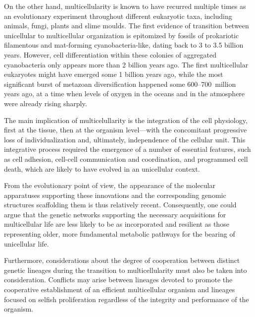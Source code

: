 \documentclass{tufte-book}
\begin{document}

On the other hand, multicellularity is known to have recurred multiple times as
an evolutionary experiment throughout different eukaryotic taxa, including
animals, fungi, plants and slime moulds.\cite{kaiser_building_2001} The first
evidence of transition between unicellular to multicellular organization is
epitomized by fossils of prokariotic filamentous and \mbox{mat-forming}
\mbox{cyanobacteria-like}, dating back to 3 to 3.5 billion
years.\cite{knoll_life_2003,schopf_microfossils_1993} However, cell
differentiation within these colonies of aggregated cyanobacteria only appears
more than 2 billion years ago.\cite{tomitani_evolutionary_2006} The first
multicellular eukaryotes might have emerged some 1 billion years
ago\cite{knoll_eukaryotic_2006}, while the most significant burst of metazoan
diversification happened some \mbox{600--700~million} years ago, at a time when
levels of oxygen in the oceans and in the atmosphere were already rising
sharply.\cite{carroll_chance_2001,king_unicellular_2004}

The main implication of multicelullarity is the integration of the cell
physiology, first at the tissue, then at the organism level---with the
concomitant progressive loss of individualization and, ultimately, independence
of the cellular unit.  This integrative process required the emergence of a
number of essential features, such as cell adhesion, \mbox{cell-cell}
communication and coordination, and programmed cell death, which are likely to
have evolved in an unicellular
context.\cite{bonner_development:_1974,bonner_first_2009,kaiser_building_2001}

From the evolutionary point of view, the appearance of the molecular apparatuses
supporting these innovations and the corresponding genomic structures
scaffolding them is thus relatively recent.  Consequently, one could argue that
the genetic networks supporting the necessary acquisitions for multicellular
life are less likely to be as incorporated and resilient as those representing
older, more fundamental metabolic pathways for the bearing of unicellular life.

Furthermore, considerations about the degree of cooperation between distinct
genetic lineages during the transition to multicellularity must also be taken
into consideration.  Conflicts may arise between lineages devoted to promote the
cooperative establishment of an efficient multicellular organism and lineages
focused on selfish proliferation regardless of the integrity and performance of
the organism.\cite{buss_evolution_1987,hammerstein_genetic_2003}
\end{document}
